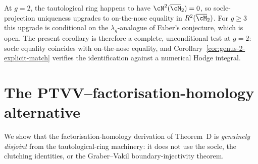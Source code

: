 \begin{remark}[Why the socle projection, not the full ring, at $g=2$]
\label{rem:genus-2-socle-remark}
At $g=2$, the tautological ring happens to have
$\cN^2(\overline{\cM}_2) = 0$, so socle-projection uniqueness
upgrades to on-the-nose equality in $R^2(\overline{\cM}_2)$. For
$g \geq 3$ this upgrade is conditional on the
$\lambda_g$-analogue of Faber's conjecture, which is open. The
present corollary is therefore a complete, unconditional test at
$g = 2$: socle equality coincides with on-the-nose equality, and
Corollary~\ref{cor:genus-2-explicit-match} verifies the
identification against a numerical Hodge integral.
\end{remark}

\section{The PTVV--factorisation-homology alternative}
\label{sec:ptvv-alternative}

We show that the factorisation-homology derivation of
Theorem~D is \emph{genuinely disjoint} from the tautological-ring
machinery: it does not use the socle, the clutching identities,
or the Graber--Vakil boundary-injectivity theorem.

